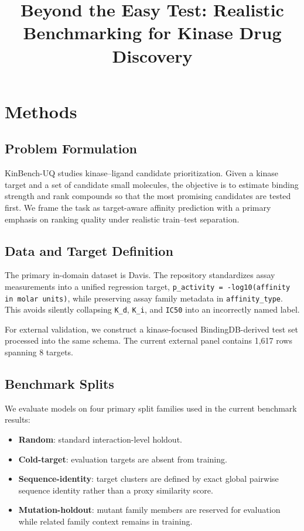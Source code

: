 \documentclass[11pt]{article}
\title{Beyond the Easy Test: Realistic Benchmarking for Kinase Drug Discovery}
\author{}
\date{}
\begin{document}
\maketitle

\section{Methods}

\subsection{Problem Formulation}

KinBench-UQ studies kinase--ligand candidate prioritization. Given a kinase
target and a set of candidate small molecules, the objective is to estimate
binding strength and rank compounds so that the most promising candidates are
tested first. We frame the task as target-aware affinity prediction with a
primary emphasis on ranking quality under realistic train--test separation.

\subsection{Data and Target Definition}

The primary in-domain dataset is Davis. The repository standardizes assay
measurements into a unified regression target,
\texttt{p\_activity = -log10(affinity in molar units)}, while preserving assay
family metadata in \texttt{affinity\_type}. This avoids silently collapsing
\texttt{K\_d}, \texttt{K\_i}, and \texttt{IC50} into an incorrectly named label.

For external validation, we construct a kinase-focused BindingDB-derived test
set processed into the same schema. The current external panel contains 1,617
rows spanning 8 targets.

\subsection{Benchmark Splits}

We evaluate models on four primary split families used in the current benchmark
results:

\begin{itemize}
  \item \textbf{Random}: standard interaction-level holdout.
  \item \textbf{Cold-target}: evaluation targets are absent from training.
  \item \textbf{Sequence-identity}: target clusters are defined by exact global
  pairwise sequence identity rather than a proxy similarity score.
  \item \textbf{Mutation-holdout}: mutant family members are reserved for
  evaluation while related family context remains in training.
\end{itemize}
\end{document}
